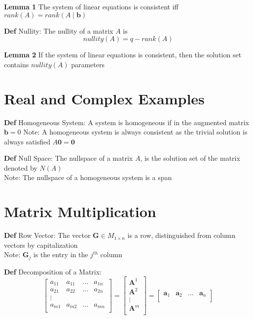 \documentclass[11pt,notitlepage]{report}
\newcommand{\tbf}[1]{\textbf{#1}}
\begin{document}
\textbf{Lemma 1} The system of linear equations is consistent iff $rank(A) = rank(A \mid \tbf b)$

\textbf{Def} Nullity: The nullity of a matrix $A$ is
$$nullity(A) = q - rank(A)$$

\textbf{Lemma 2} If the system of linear equations is consistent, then the solution set contains $nullity(A)$ parameters

\section{Real and Complex Examples}

\textbf{Def} Homogeneous System: A system is homogeneous if in the augmented matrix $\tbf b = 0$
\hspace*{5mm} Note: A homogeneous system is always consistent as the trivial solution is always satisfied $A\tbf 0 = \tbf 0$

\textbf{Def} Null Space: The nullspace of a matrix $A$, is the solution set of the matrix denoted by $N(A)$\\
\hspace*{5mm} Note: The nullspace of a homogeneous system is a span


\section{Matrix Multiplication}

\textbf{Def} Row Vector: The vector $\tbf G \in M_{1\times n}$ is a row, distinguished from column vectors by capitalization\\
\hspace*{5mm} Note: $\tbf G_j$ is the entry in the $j^{th}$ column

\textbf{Def} Decomposition of a Matrix: 
$$\begin{bmatrix}
a_{11} & a_{11} & \dots & a_{1n}\\
a_{21} & a_{22} & \dots & a_{2n}\\
\vdots\\
a_{m1} & a_{m2} & \dots & a_{mn}\\
\end{bmatrix} = \begin{bmatrix}
\tbf A^1\\
\tbf A^2\\
\vdots\\
\tbf A^m\\
\end{bmatrix} = \begin{bmatrix}
\tbf a_{1} & \tbf a_{2} & \dots & \tbf a_{n}\\
\end{bmatrix}$$
\end{document}
